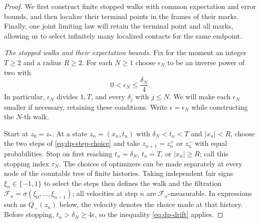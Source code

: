 \documentclass[11pt]{article}
\numberwithin{equation}{section}
\theoremstyle{definition}
\theoremstyle{remark}
\begin{document}
\begin{proof}
We first construct finite stopped walks with common expectation and error
bounds, and then localize their terminal points in the frames of their
marks.  Finally, one joint limiting law will retain the terminal point and
all marks, allowing us to select infinitely many localized contacts for the
same endpoint.

\medskip\noindent\emph{The stopped walks and their expectation bounds.}
Fix for the moment an integer $T\ge2$ and a radius $R\ge2$.  For each
$N\ge1$ choose $\epsilon_N$ to be an inverse power of two with
\begin{equation}\label{eq:contact-grid}
  0<\epsilon_N\le\frac{\delta_N}{4}.
\end{equation}
In particular, $\epsilon_N$ divides $1,T$, and every $\delta_j$ with
$j\le N$.  We will make each $\epsilon_N$ smaller if necessary, retaining
these conditions.  Write $\epsilon=\epsilon_N$ while constructing the
$N$-th walk.

Start at $z_0=z_*$.  At a state $z_n=(x_n,t_n)$ with
$\delta_N<t_n<T$ and $|x_n|<R$, choose the two steps of
\eqref{eq:dp-step-choice} and take $z_{n+1}=z_n^+$ or $z_n^-$ with equal
probabilities.  Stop on first reaching $t_n=\delta_N$, $t_n=T$, or
$|x_n|\ge R$; call this stopping index $\tau_N$.  The choices of optimizers
can be made separately at every node of the countable tree of finite
histories.  Taking independent fair signs $\xi_n\in\{-1,1\}$ to select the
steps then defines the walk and the filtration
$\mathcal F_n=\sigma(\xi_0,\ldots,\xi_{n-1})$; all velocities at step $n$
are $\mathcal F_n$-measurable.  In expressions such as $Q_-(z_n)$ below,
the velocity denotes the choice made at that history.  Before stopping,
$t_n>\delta_N\ge4\epsilon$, so the inequality \eqref{eq:dp-drift} applies.


\end{proof}
\end{document}
